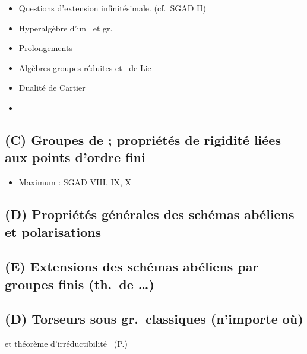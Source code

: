 \documentclass[11pt,a4paper]{article}
\begin{document}
\begin{itemize}
\item[§7] Questions d'extension infinitésimale. (cf.\ SGAD II)

\item[§8] Hyperalgèbre d'un \ill\ et gr.\  \ill

\item[§9] Prolongements

\item[§10] Algèbres  groupes réduites et \ill\ de Lie

\item[§11] Dualité de Cartier

\item[\struck{§\ill}] \struck{\ill}
\end{itemize}

\subsection*{(C) Groupes de \ill ; propriétés de rigidité liées aux points d'ordre fini}

\begin{itemize}
\item[§12] Maximum : SGAD VIII, IX, X
\end{itemize}


\subsection*{(D) Propriétés générales des schémas abéliens et polarisations}

\subsection*{(E) Extensions des schémas abéliens par groupes finis (th.\ de \uncertain{\ill}\ldots)}


\subsection*{(D)  Torseurs sous gr.\ classiques (n'importe où)}

et théorème d'irréductibilité \ill\ (P.)
\end{document}
